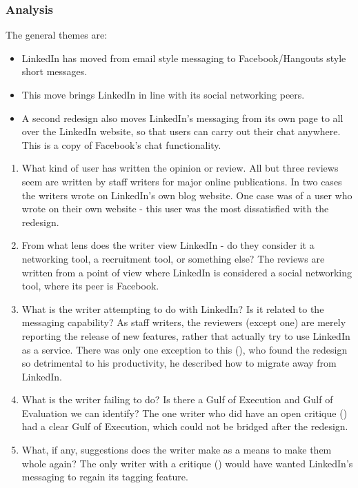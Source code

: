 \documentclass[
	letterpaper, %
]{jdf}
\begin{document}
\subsubsection{Analysis}

The general themes are:
\begin{itemize}
    \item LinkedIn has moved from email style messaging to Facebook/Hangouts style short messages. 
    \item This move brings LinkedIn in line with its social networking peers.
    \item A second redesign also moves LinkedIn's messaging from its own page to all over the LinkedIn website, so that users can carry out their chat anywhere. This is a copy of Facebook's chat functionality.
\end{itemize}


\begin{enumerate}
    \item What kind of user has written the opinion or review.
    All but three reviews seem are written by staff writers for major online publications. In two cases the writers wrote on LinkedIn's own blog website. One case was of a user who wrote on their own website - this user was the most dissatisfied with the redesign.
    \item From what lens does the writer view LinkedIn - do they consider it a networking tool, a recruitment tool, or something else? 
    The reviews are written from a point of view where LinkedIn is considered a social networking tool, where its peer is Facebook.
    \item What is the writer attempting to do with LinkedIn? Is it related to the messaging capability?
    As staff writers, the reviewers (except one) are merely reporting the release of new features, rather that actually try to use LinkedIn as a service. There was only one exception to this (\cite{driskell_2017}), who found the redesign so detrimental to his productivity, he described how to migrate away from LinkedIn.
    
    \item What is the writer failing to do? Is there a Gulf of Execution and Gulf of Evaluation we can identify?
    The one writer who did have an open critique (\cite{driskell_2017}) had a clear Gulf of Execution, which could not be bridged after the redesign.
    
    \item What, if any, suggestions does the writer make as a means to make them whole again?
    The only writer with a critique (\cite{driskell_2017}) would have wanted LinkedIn's messaging to regain its tagging feature.
\end{enumerate}
\end{document}
